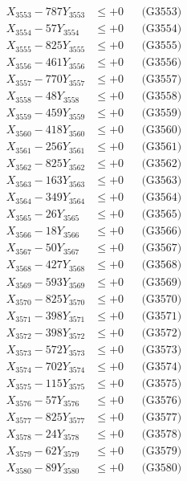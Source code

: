 \documentclass[a4paper,10pt]{article}
\begin{document}
{\begin{align}
X_{3553} - 787Y_{3553} &\leq +0 && \text{(G3553)} \\
X_{3554} - 57Y_{3554} &\leq +0 && \text{(G3554)} \\
X_{3555} - 825Y_{3555} &\leq +0 && \text{(G3555)} \\
X_{3556} - 461Y_{3556} &\leq +0 && \text{(G3556)} \\
X_{3557} - 770Y_{3557} &\leq +0 && \text{(G3557)} \\
X_{3558} - 48Y_{3558} &\leq +0 && \text{(G3558)} \\
X_{3559} - 459Y_{3559} &\leq +0 && \text{(G3559)} \\
X_{3560} - 418Y_{3560} &\leq +0 && \text{(G3560)} \\
\allowbreak
X_{3561} - 256Y_{3561} &\leq +0 && \text{(G3561)} \\
X_{3562} - 825Y_{3562} &\leq +0 && \text{(G3562)} \\
X_{3563} - 163Y_{3563} &\leq +0 && \text{(G3563)} \\
X_{3564} - 349Y_{3564} &\leq +0 && \text{(G3564)} \\
X_{3565} - 26Y_{3565} &\leq +0 && \text{(G3565)} \\
X_{3566} - 18Y_{3566} &\leq +0 && \text{(G3566)} \\
X_{3567} - 50Y_{3567} &\leq +0 && \text{(G3567)} \\
X_{3568} - 427Y_{3568} &\leq +0 && \text{(G3568)} \\
X_{3569} - 593Y_{3569} &\leq +0 && \text{(G3569)} \\
X_{3570} - 825Y_{3570} &\leq +0 && \text{(G3570)} \\
\allowbreak
X_{3571} - 398Y_{3571} &\leq +0 && \text{(G3571)} \\
X_{3572} - 398Y_{3572} &\leq +0 && \text{(G3572)} \\
X_{3573} - 572Y_{3573} &\leq +0 && \text{(G3573)} \\
X_{3574} - 702Y_{3574} &\leq +0 && \text{(G3574)} \\
X_{3575} - 115Y_{3575} &\leq +0 && \text{(G3575)} \\
X_{3576} - 57Y_{3576} &\leq +0 && \text{(G3576)} \\
X_{3577} - 825Y_{3577} &\leq +0 && \text{(G3577)} \\
X_{3578} - 24Y_{3578} &\leq +0 && \text{(G3578)} \\
X_{3579} - 62Y_{3579} &\leq +0 && \text{(G3579)} \\
X_{3580} - 89Y_{3580} &\leq +0 && \text{(G3580)} \\

\end{align}}
\end{document}
